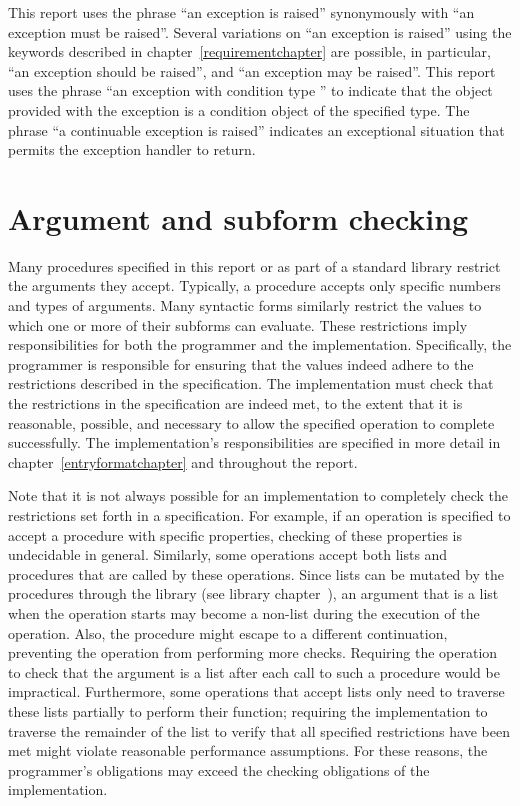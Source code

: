 This report uses the phrase ``an exception is raised'' synonymously
with ``an exception must be raised''.  Several variations on ``an
exception is raised'' using the keywords described in
chapter~\ref{requirementchapter} are possible, in particular, ``an
exception should be raised'', and ``an exception may be raised''.
This report uses the phrase ``an exception with condition type ''
to indicate that the object provided with the
exception is a condition object of the specified type.
The phrase ``a continuable exception is raised'' indicates an
exceptional situation that permits the exception handler to return.

\section{Argument and subform checking}
\label{argumentcheckingsection}

Many procedures specified in this report or as part of a
standard library restrict the arguments they accept.
Typically, a procedure accepts only specific numbers and types of arguments.
Many syntactic forms similarly restrict the values to which one or
more of their subforms can evaluate.
These restrictions imply responsibilities for
both the programmer and the implementation.
Specifically, the programmer is responsible for ensuring
that the values indeed adhere to the restrictions described
in the specification.  The implementation must check
that the restrictions in the specification are indeed met, to the
extent that it is reasonable, possible, and necessary to allow the
specified operation to complete successfully.  The implementation's
responsibilities are specified in more detail in
chapter~\ref{entryformatchapter} and throughout the report.

Note that it is not always possible for an implementation to completely check
the restrictions set forth in a specification.  For example, if an
operation is specified to accept a procedure with specific properties,
checking of these properties is undecidable in general.  Similarly,
some operations accept both lists and procedures that are
called by these operations.  Since lists can be mutated by the procedures
through the  library (see library
chapter~), an argument that is a list
when the operation starts may become a non-list during the execution of the operation.
Also, the procedure might escape to a different continuation,
preventing the operation from performing more checks.
Requiring the operation to check that the argument is a list after
each call to such a procedure would be impractical.  Furthermore, some
operations that accept lists only need to traverse these lists
partially to perform their function; requiring the implementation to
traverse the remainder of the list to verify that all specified
restrictions have been met might
violate reasonable performance assumptions.  For these reasons, the
programmer's obligations may exceed the checking obligations of the
implementation.

